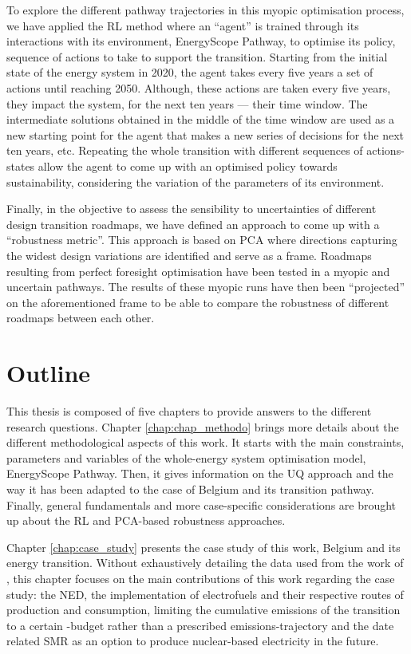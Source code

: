 To explore the different pathway trajectories in this myopic optimisation process, we have applied the \gls{RL} method where an ``agent'' is trained through its interactions with its environment, EnergyScope Pathway, to optimise its policy, \ie sequence of actions to take to support the transition. Starting from the initial state of the energy system in 2020, the agent takes every five years a set of actions until reaching 2050. Although, these actions are taken every five years, they impact the system, for the next ten years --- their time window. The intermediate solutions obtained in the middle of the time window are used as a new starting point for the agent that makes a new series of decisions for the next ten years, etc. Repeating the whole transition with different sequences of actions-states allow the agent to come up with an optimised policy towards sustainability, considering the variation of the parameters of its environment.

Finally, in the objective to assess the sensibility to uncertainties of different design transition roadmaps, we have defined an approach to come up with a ``robustness metric''. This approach is based on \gls{PCA} where directions capturing the widest design variations are identified and serve as a frame. Roadmaps resulting from perfect foresight optimisation have been tested in a myopic and uncertain pathways. The results of these myopic runs have then been ``projected'' on the aforementioned frame to be able to compare the robustness of different roadmaps between each other.

\section*{Outline}
This thesis is composed of five chapters to provide answers to the different research questions. Chapter \ref{chap:chap_methodo} brings more details about the different methodological aspects of this work. It starts with the main constraints, parameters and variables of the whole-energy system optimisation model, EnergyScope Pathway. Then, it gives information on the \gls{UQ} approach and the way it has been adapted to the case of Belgium and its transition pathway. Finally, general fundamentals and more case-specific considerations are brought up about the \gls{RL} and \gls{PCA}-based robustness approaches.

Chapter \ref{chap:case_study} presents the case study of this work, \ie Belgium and its energy transition. Without exhaustively detailing the data used from the work of \citet{limpens2021generating}, this chapter focuses on the main contributions of this work regarding the case study: the \gls{NED}, the implementation of electrofuels and their respective routes of production and consumption, limiting  the cumulative emissions of the transition to a certain -budget rather than a prescribed emissions-trajectory and the date related \gls{SMR} as an option to produce nuclear-based electricity in the future.

